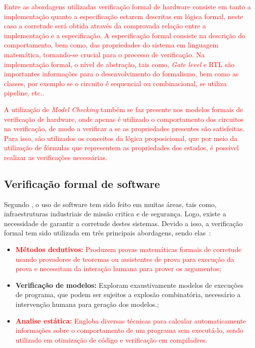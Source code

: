 \par
\textcolor{red}{Entre as abordagens utilizadas verificação formal de hardware consiste em tanto a implementação quanto a especificação estarem descritas em lógica formal, neste caso a corretude será obtida através da comprovada relação entre a implementação e a especificação\cite{seger1992introduction}. A especificação formal consiste na descrição do comportamento, bem como, das propriedades do sistema em linguagem matemática, tornando-se crucial para o processo de verificação. Na implementação formal, o nível de abstração, tais como, \textit{Gate level} e RTL são importantes informações para o desenvolvimento do formalismo, bem como as classes, por exemplo se o circuito é sequencial ou combinacional, se utiliza pipeline, etc.\cite{kropf2013introduction}.}

\par
\textcolor{red}{A utilização de \textit{Model Checking} também se faz presente nos modelos formais de verificação de hardware, onde apenas é utilizado o comportamento dos circuitos na verificação, de modo a verificar a se as propriedades  presentes são satisfeitas. Para isso, são utilizados os conceitos da lógica proposicional, que por meio da utilização de fórmulas que representem as propriedades dos estados, é possível realizar as verificações necessárias\cite{seger1992introduction}.}
 
\subsection{Verificação formal de software}

Segundo \citeauthor{rocha2015verificaccao}, o uso de software tem sido feito em muitas áreas, tais como, infraestruturas industriais de missão critica e de segurança.  Logo, existe a necessidade de garantir a corretude destes sistemas. Devido a isso, a verificação formal tem sido utilizada em três principais abordagens, sendo elas~\cite{cousot2010gentle,d2008survey}:
\begin{itemize}
 \item \textcolor{red}{\textbf{Métodos dedutivos:} Produzem provas matemáticas formais de corretude usando provadores de teoremas ou assistentes de prova para execução da prova e necessitam da interação humana para prover os argumentos\cite{cousot2010gentle};}
  \item \textbf{Verificação de modelos:} Exploram exaustivamente modelos de execuções de programa, que podem ser sujeitos a explosão combinatória, necessário a intervenção humana para geração dos modelos.\cite{rocha2015verificaccao};
  \item \textcolor{red}{\textbf{Analise estática:} Engloba diversas técnicas para calcular automaticamente informações sobre o comportamento de um programa sem executá-lo, sendo utilizado em otimização de código e verificação em compiladres\cite{d2008survey}.}
\end{itemize}

